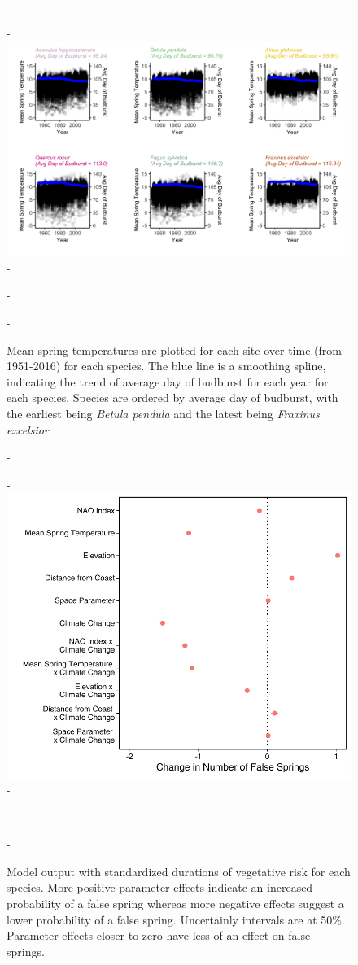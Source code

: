 \documentclass{article}\usepackage[]{graphicx}\usepackage[]{color}
\begin{document}
{\begin{figure} [H]
  -\begin{center}
  -\includegraphics[width=16cm]{..//figures/MSTBB_bySpp.png}
  -\caption{Mean spring temperatures are plotted for each site over time (from 1951-2016) for each species. The blue line is a smoothing spline, indicating the trend of average day of budburst for each year for each species. Species are ordered by average day of budburst, with the earliest being \textit{Betula pendula} and the latest being \textit{Fraxinus excelsior}. }\label{fig:mst}
  -\end{center}
  -\end{figure}}
  
  
{\begin{figure} [H]
  -\begin{center}
  -\includegraphics[width=12cm]{..//figures/model_output_bern_50.pdf}
  -\caption{Model output with standardized durations of vegetative risk for each species. More positive parameter effects indicate an increased probability of a false spring whereas more negative effects suggest a lower probability of a false spring. Uncertainly intervals are at 50\%. Parameter effects closer to zero have less of an effect on false springs.}\label{fig:maineffects}
  -\end{center}
  -\end{figure}}
  
\end{document}

